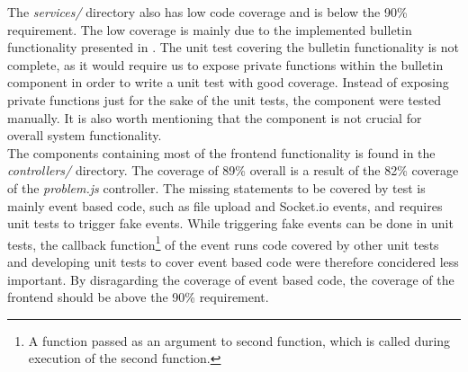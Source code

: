 The \textit{services/} directory also has low code coverage and is below the 90\% requirement. The low coverage is mainly due to the implemented bulletin functionality presented in . The unit test covering the bulletin functionality is not complete, as it would require us to expose private functions within the bulletin component in order to write a unit test with good coverage. Instead of exposing private functions just for the sake of the unit tests, the component were tested manually. It is also worth mentioning that the component is not crucial for overall system functionality. \\

The components containing most of the frontend functionality is found in the \textit{controllers/} directory. The coverage of 89\% overall is a result of the 82\% coverage of the \textit{problem.js} controller. The missing statements to be covered by test is mainly event based code, such as file upload and Socket.io events, and requires unit tests to trigger fake events. While triggering fake events can be done in unit tests, the callback function\footnote{A function passed as an argument to second function, which is called during execution of the second function.} of the event runs code covered by other unit tests and developing unit tests to cover event based code were therefore concidered less important. By disragarding the coverage of event based code, the coverage of the frontend should be above the 90\% requirement.

